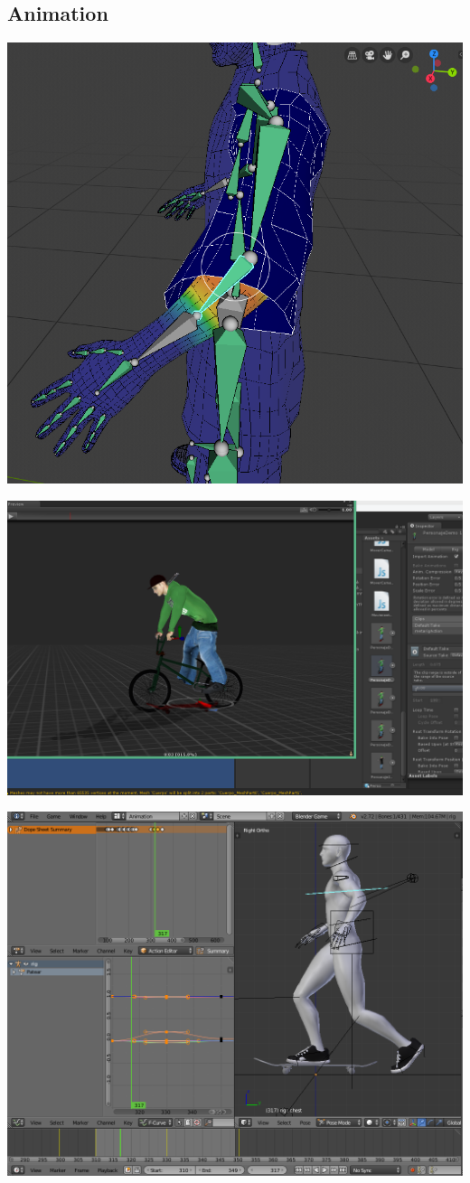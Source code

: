 \documentclass{article}
\begin{document}
  \subsection{Animation}
  \includegraphics[width=\textwidth]{30.png}

  \includegraphics[width=\textwidth]{28.png}

  \includegraphics[width=\textwidth]{29.png}
\end{document}
